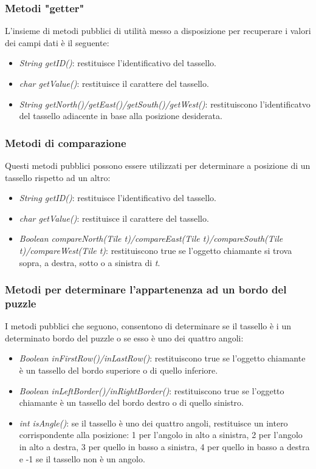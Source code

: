 \documentclass{article}
\begin{document}
\subsubsection{Metodi "getter"}
L'insieme di metodi pubblici di utilità messo a disposizione per recuperare i valori dei campi dati è il seguente:
\begin{itemize}
\item \textit{String getID()}: restituisce l'identificativo del tassello.
\item \textit{char getValue()}: restituisce il carattere del tassello.
\item \textit{String getNorth()/getEast()/getSouth()/getWest()}: restituiscono l'identificatvo del tassello adiacente in base alla posizione desiderata.
\end{itemize}
\subsubsection{Metodi di comparazione}
Questi metodi pubblici possono essere utilizzati per determinare a posizione di un tassello rispetto ad un altro:
\begin{itemize}
\item \textit{String getID()}: restituisce l'identificativo del tassello.
\item \textit{char getValue()}: restituisce il carattere del tassello.
\item \textit{Boolean compareNorth(Tile t)/compareEast(Tile t)/compareSouth(Tile t)/compareWest(Tile t)}: restituiscono true se l'oggetto chiamante si trova sopra, a destra, sotto o a sinistra di \textit{t}.
\end{itemize} 
\subsubsection{Metodi per determinare l'appartenenza ad un bordo del puzzle}
I metodi pubblici che seguono, consentono di determinare se il tassello è i un determinato bordo del puzzle o se esso è uno dei quattro angoli:
\begin{itemize}
\item \textit{Boolean inFirstRow()/inLastRow()}: restituiscono true se l'oggetto chiamante è un tassello del bordo superiore o di quello inferiore.
\item \textit{Boolean inLeftBorder()/inRightBorder()}: restituiscono true se l'oggetto chiamante è un tassello del bordo destro o di quello sinistro.
\item \textit{int isAngle()}: se il tassello è uno dei quattro angoli, restituisce un intero corrispondente alla posizione: 1 per l'angolo in alto a sinistra, 2 per l'angolo in alto a destra, 3 per quello in basso a sinistra, 4 per quello in basso a destra e -1 se il tassello non è un angolo.
\end{itemize} 
\end{document}
